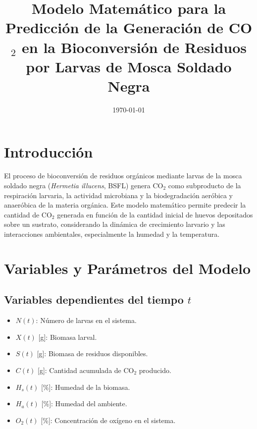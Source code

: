 \documentclass{article}
\begin{document}
\title{Modelo Matemático para la Predicción de la Generación de CO$_2$ en la Bioconversión de Residuos por Larvas de Mosca Soldado Negra}
\author{}
\date{\today}
\maketitle

\section{Introducción}
El proceso de bioconversión de residuos orgánicos mediante larvas de la mosca soldado negra (\textit{Hermetia illucens}, BSFL) genera CO$_2$ como subproducto de la respiración larvaria, la actividad microbiana y la biodegradación aeróbica y anaeróbica de la materia orgánica. Este modelo matemático permite predecir la cantidad de CO$_2$ generada en función de la cantidad inicial de huevos depositados sobre un sustrato, considerando la dinámica de crecimiento larvario y las interacciones ambientales, especialmente la humedad y la temperatura.

\section{Variables y Parámetros del Modelo}
\subsection{Variables dependientes del tiempo $t$}
\begin{itemize}
    \item $N(t)$: Número de larvas en el sistema.
    \item $X(t)$ [g]: Biomasa larval.
    \item $S(t)$ [g]: Biomasa de residuos disponibles.
    \item $C(t)$ [g]: Cantidad acumulada de CO$_2$ producido.
    \item $H_s(t)$ [\%]: Humedad de la biomasa.
    \item $H_a(t)$ [\%]: Humedad del ambiente.
    \item $O_2(t)$ [\%]: Concentración de oxígeno en el sistema.
\end{itemize}
\end{document}
